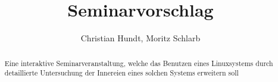 \documentclass[a4paper]{scrartcl}
\date{}
\author{Christian Hundt, Moritz Schlarb}
\title{Seminarvorschlag}
\begin{document}
\maketitle

\begin{abstract}
Eine interaktive Seminarveranstaltung, welche das Benutzen eines Linuxsystems durch
detaillierte Untersuchung der Innereien eines solchen Systems erweitern soll
\end{abstract}
\end{document}
